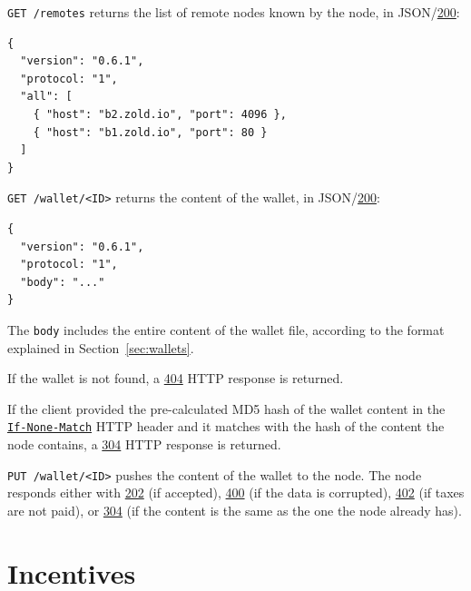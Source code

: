\documentclass[11pt,oneside]{article}
\newcommand\dd[1]{\colorbox{gray!30}{\texttt{#1}}}
\begin{document}
\dd{GET /remotes} returns the list of remote nodes known by the node,
in JSON/\href{https://www.w3.org/Protocols/rfc2616/rfc2616-sec10.html#sec10.2.1}{200}:

\begin{verbatim}
{
  "version": "0.6.1",
  "protocol: "1",
  "all": [
    { "host": "b2.zold.io", "port": 4096 },
    { "host": "b1.zold.io", "port": 80 }
  ]
}\end{verbatim}

\dd{GET /wallet/<ID>} returns the content of the wallet, in
JSON/\href{https://www.w3.org/Protocols/rfc2616/rfc2616-sec10.html#sec10.2.1}{200}:

\begin{verbatim}
{
  "version": "0.6.1",
  "protocol: "1",
  "body": "..."
}\end{verbatim}

The \dd{body} includes the entire content of the wallet file, according
to the format explained in Section~\ref{sec:wallets}.

If the wallet is not found, a
\href{https://www.w3.org/Protocols/rfc2616/rfc2616-sec10.html#sec10.4.5}{404}
HTTP response is returned.

If the client provided the pre-calculated MD5 hash of the wallet content in the
\href{https://www.w3.org/Protocols/rfc2616/rfc2616-sec14.html#sec14.26}{\dd{If-None-Match}}
HTTP header and it matches with the hash of the
content the node contains, a
\href{https://www.w3.org/Protocols/rfc2616/rfc2616-sec10.html#sec10.3.5}{304} HTTP response is returned.

\dd{PUT /wallet/<ID>} pushes the content of the wallet to the node. The
node responds either with
\href{https://www.w3.org/Protocols/rfc2616/rfc2616-sec10.html#sec10.2.3}{202} (if accepted),
\href{https://www.w3.org/Protocols/rfc2616/rfc2616-sec10.html#sec10.4.1}{400} (if the data is corrupted),
\href{https://www.w3.org/Protocols/rfc2616/rfc2616-sec10.html#sec10.4.3}{402} (if taxes are not paid),
or
\href{https://www.w3.org/Protocols/rfc2616/rfc2616-sec10.html#sec10.3.5}{304}
(if the content is the same as the one the node already has).

\section{Incentives}\label{sec:incentives}
\end{document}
